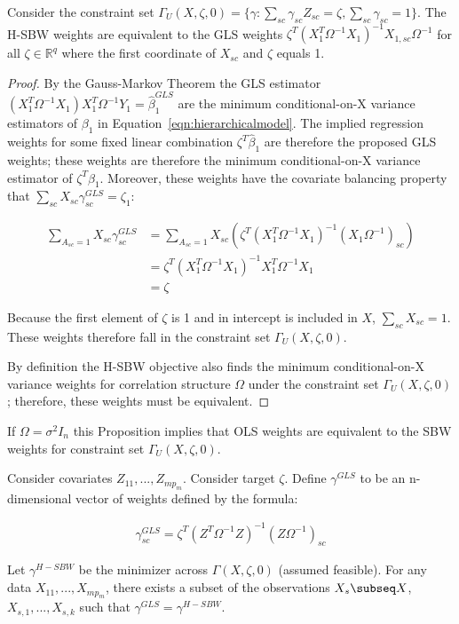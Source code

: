 \begin{proposition}
    Consider the constraint set $\Gamma_U(X, \zeta, 0) = \{\gamma: \sum_{sc}\gamma_{sc}Z_{sc} = \zeta, \sum_{sc}\gamma_{sc} = 1\}$. The H-SBW weights are equivalent to the GLS weights $\zeta^T(X_1^T\Omega^{-1}X_1)^{-1}X_{1, sc}\Omega^{-1}$ for all $\zeta \in \mathbb{R}^q$ where the first coordinate of $X_{sc}$ and $\zeta$ equals 1.
\end{proposition}

\begin{proof}
    By the Gauss-Markov Theorem the GLS estimator $(X_1^T\Omega^{-1}X_1)X_1^T\Omega^{-1}Y_1 = \hat{\beta}_1^{GLS}$ are the minimum conditional-on-X variance estimators of $\beta_1$ in Equation~\ref{eqn:hierarchicalmodel}. The implied regression weights for some fixed linear combination $\zeta^T\hat{\beta}_1$ are therefore the proposed GLS weights; these weights are therefore the minimum conditional-on-X variance estimator of $\zeta^T\beta_1$. Moreover, these weights have the covariate balancing property that $\sum_{sc}X_{sc}\gamma_{sc}^{GLS} = \zeta_1$:
    
    \begin{align*}
        \sum_{A_{sc} = 1} X_{sc}\gamma_{sc}^{GLS} &= \sum_{A_{sc} = 1} X_{sc}(\zeta^T(X_1^T\Omega^{-1}X_1)^{-1}(X_1\Omega^{-1})_{sc}) \\
        &= \zeta^T(X_1^T\Omega^{-1}X_1)^{-1}X_1^T\Omega^{-1}X_1 \\
        &= \zeta
    \end{align*}
    
    Because the first element of $\zeta$ is 1 and in intercept is included in $X$, $\sum_{sc}X_{sc} = 1$. These weights therefore fall in the constraint set $\Gamma_U(X, \zeta, 0)$.
    
    By definition the H-SBW objective also finds the minimum conditional-on-X variance weights for correlation structure $\Omega$ under the constraint set $\Gamma_U(X, \zeta, 0)$; therefore, these weights must be equivalent.
\end{proof}

\begin{remark}
    If $\Omega = \sigma^2I_n$ this Proposition implies that OLS weights are equivalent to the SBW weights for constraint set $\Gamma_U(X, \zeta, 0)$. 
\end{remark}

\begin{proposition}
Consider covariates $Z_{11}, ..., Z_{mp_m}$. Consider target $\zeta$. Define $\gamma^{GLS}$ to be an n-dimensional vector of weights defined by the formula:

\begin{align*}
    \gamma_{sc}^{GLS} = \zeta^T(Z^T\Omega^{-1}Z)^{-1}(Z\Omega^{-1})_{sc}
\end{align*}

Let $\gamma^{H-SBW}$ be the minimizer across $\Gamma(X, \zeta, 0)$ (assumed feasible). For any data $X_{11}, ..., X_{mp_m}$, there exists a subset of the observations $X_s \subseq X$, $X_{s, 1}, ..., X_{s, k}$ such that $\gamma^{GLS} = \gamma^{H-SBW}$.
\end{proposition}

